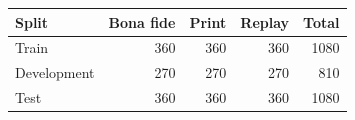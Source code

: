 \begin{tabular}{lrrrr}
\toprule
Split & Bona fide & Print & Replay & Total \\
\midrule
Train & 360 & 360 & 360 & 1080 \\
Development & 270 & 270 & 270 & 810 \\
Test & 360 & 360 & 360 & 1080 \\
\bottomrule
\end{tabular}
